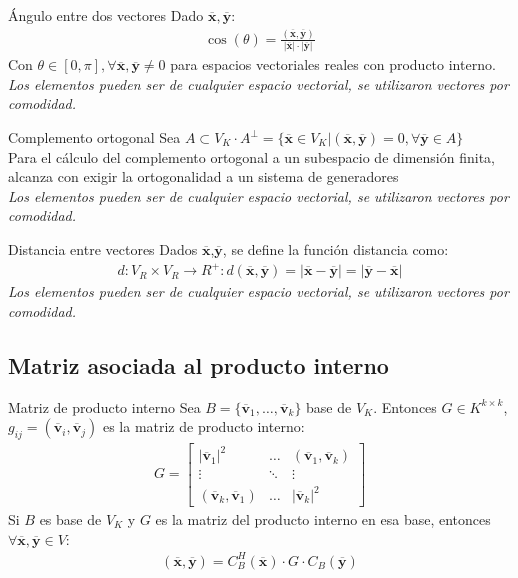\documentclass[a4paper, twoside]{article}
\numberwithin{equation}{section}
\numberwithin{figure}{section}
\numberwithin{table}{section}
\newcommand{\vect}[1]{\overline{\textbf{#1}}}
\newcommand{\dete}[1]{\left\vert #1 \right\vert}
\newcommand{\produ}[1]{(#1)}
\begin{document}
\begin{definicion*}{Ángulo entre dos vectores}
	Dado $\vect{x},\vect{y}$:
	\begin{align}
		\cos(\theta)=\frac{\produ{\vect{x},\vect{y}}}{\dete{\vect{x}} \cdot \dete{\vect{y}}}
	\end{align}
	Con $\theta \in [0,\pi], \forall \vect{x},\vect{y} \neq 0$ para espacios vectoriales reales con producto interno.\\
	
	\emph{Los elementos pueden ser de cualquier espacio vectorial, se utilizaron vectores por comodidad.}
\end{definicion*}

\begin{definicion*}{Complemento ortogonal}
	Sea $A \subset V_K \cdot A^\bot=\{\vect{x} \in V_K \vert \produ{\vect{x},\vect{y}}=0, \forall \vect{y} \in A \}$\\
	
	Para el cálculo del complemento ortogonal a un subespacio de dimensión finita, alcanza con exigir la ortogonalidad a un sistema de generadores\\
	
	\emph{Los elementos pueden ser de cualquier espacio vectorial, se utilizaron vectores por comodidad.}
\end{definicion*}

\begin{definicion*}{Distancia entre vectores}
	Dados $\vect{x}$,$\vect{y}$, se define la función distancia como:
	\begin{align}
		d:V_R \times V_R \to R^+:d(\vect{x},\vect{y})=\dete{\vect{x}-\vect{y}}=\dete{\vect{y}-\vect{x}}
	\end{align}
	\emph{Los elementos pueden ser de cualquier espacio vectorial, se utilizaron vectores por comodidad.}
\end{definicion*}

\subsection{Matriz asociada al producto interno}
\begin{definicion*}{Matriz de producto interno}
	Sea $B = \{ \vect{v}_1, \ldots, \vect{v}_k \}$ base de $V_K$. Entonces $G \in K^{ k \times k }$, $g_{ij} = \produ{ \vect{v}_i, \vect{v}_j }$ es la matriz de producto interno:
	\begin{align}
		G = \begin{bmatrix}
				{\dete{\vect{v}_1}^2} & {\ldots} & {\produ{\vect{v}_1,\vect{v}_k}}\\
				{\vdots} & {\ddots} & {\vdots}\\
				{\produ{\vect{v}_k,\vect{v}_1}} & {\ldots} & {\dete{\vect{v}_k}^2}
			\end{bmatrix}
	\end{align}
	Si $B$ es base de $V_K$ y $G$ es la matriz del producto interno en esa base, entonces $\forall \vect{x},\vect{y} \in V$:
	\begin{align}
		\produ{\vect{x},\vect{y}}=C_B^H(\vect{x}) \cdot G \cdot C_B(\vect{y})
	\end{align}
\end{definicion*}
\end{document}
